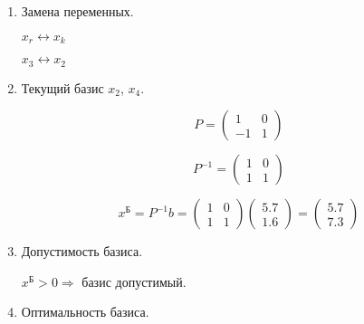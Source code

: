 \begin{enumerate}
\begin{enumerate}
	$r = \argmin\limits_i\left\{ \frac{x_i^{\text{Б}}}{z_i} \Bigl|_{z_i > 0} \right\}$
	
	$\frac{x^{\text{Б}}}{z} = \begin{pmatrix}
		\frac{5.7}{1} \\ \frac{1.6}{-1}
	\end{pmatrix}
	=
	\begin{pmatrix}
		5.7 \\ -1.6
	\end{pmatrix}$
	
	$r = 3$

	\item Замена переменных.
	
	$x_r \leftrightarrow x_k$
	
	$x_3 \leftrightarrow x_2$
	
	\item Текущий базис $x_2$, $x_4$.
	
	\begin{displaymath}
		P = \begin{pmatrix}
			1 & 0 \\ -1 & 1
		\end{pmatrix}
	\end{displaymath}	
	
	\begin{displaymath}
		P^{-1} = \begin{pmatrix}
			1 & 0 \\ 1 & 1
		\end{pmatrix}
	\end{displaymath}		
	
	\begin{displaymath}
		x^{\text{Б}} = P^{-1}b = \begin{pmatrix}
			1 & 0 \\ 1 & 1
		\end{pmatrix}
		\begin{pmatrix}
			5.7 \\ 1.6
		\end{pmatrix}
		=
		\begin{pmatrix}
			5.7 \\ 7.3
		\end{pmatrix}
	\end{displaymath}
	
	\item Допустимость базиса.
	
	$x^{\text{Б}} > 0 \Rightarrow$ базис допустимый.
	
	\item Оптимальность базиса.
	

\end{enumerate}
\end{enumerate}
